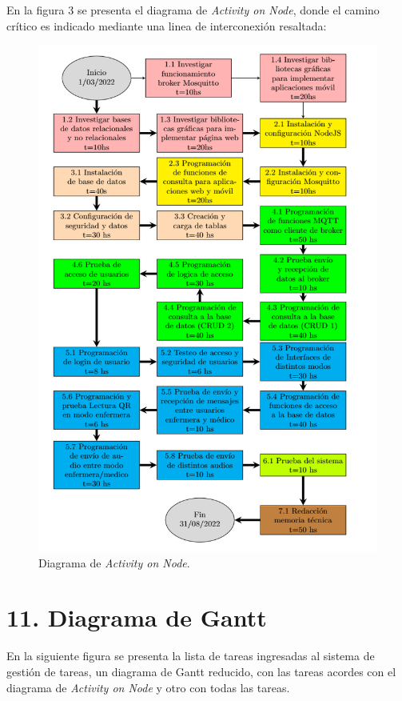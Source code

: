 \documentclass[
11pt, %
]{charter}
\begin{document}
En la figura 3 se presenta el diagrama de \textit{Activity on Node}, donde el camino crítico es indicado mediante una linea de interconexión resaltada:
\begin{figure}[htpb]
\centering 
\includegraphics[width=.8\textwidth]{./Figuras/diagramaAoN.png}
\caption{Diagrama de \textit{Activity on Node}.}
\label{fig:AoN}
\end{figure}


\section{11. Diagrama de Gantt}
\label{sec:gantt}
En la siguiente figura se presenta la lista de tareas ingresadas al sistema de gestión de tareas, un diagrama de Gantt reducido, con las tareas acordes con el diagrama de \textit{Activity on Node} y otro con todas las tareas.
\end{document}
